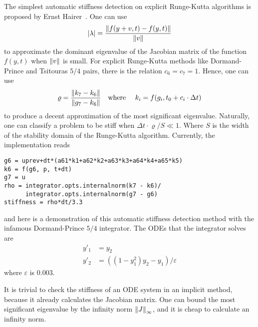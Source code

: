 \documentclass[12pt,a4paper]{article}
\begin{document}
The simplest automatic stiffness detection on explicit Runge-Kutta algorithms
is proposed by Ernst Hairer~\cite{hairer2}. One can use
\begin{equation}
  \abs{\lambda} = \frac{\norm{f(y+v, t)-f(y, t)}}{\norm{v}}
\end{equation}
to approximate the dominant eigenvalue of the Jacobian matrix of the function
$f(y, t)$ when $\norm{v}$ is small. For explicit Runge-Kutta methods like
Dormand-Prince and Tsitouras $5/4$ pairs, there is the relation $c_6 = c_7 =
1$. Hence, one can use
\begin{equation}
  \varrho = \frac{\norm{k_7-k_6}}{\norm{g_7-k_6}}\qqtext{where } k_i = f(g_i,
  t_0 + c_i\cdot \Delta t)
\end{equation}
to produce a decent approximation of the most significant eigenvalue.
Naturally, one can classify a problem to be stiff when $\Delta
t\cdot\varrho/S \ll 1$. Where $S$ is the width of the stability domain of the
Runge-Kutta algorithm. Currently, the implementation reads

\begin{lstlisting}
g6 = uprev+dt*(a61*k1+a62*k2+a63*k3+a64*k4+a65*k5)
k6 = f(g6, p, t+dt)
g7 = u
rho = integrator.opts.internalnorm(k7 - k6)/
      integrator.opts.internalnorm(g7 - g6)
stiffness = rho*dt/3.3
\end{lstlisting}

and here is a demonstration of this automatic stiffness detection method with
the infamous Dormand-Prince $5/4$ integrator. The ODEs that the integrator
solves are
\begin{align}
  y'_1 &= y_2\\
  y'_2 &= ((1-y_1^2)y_2-y_1) / \varepsilon
\end{align}
where $\varepsilon$ is $0.003$.



%
%

It is trivial to check the stiffness of an ODE system in an implicit method,
because it already calculates the Jacobian matrix. One can bound the most
significant eigenvalue by the infinity norm $\norm{J}_{\infty}$, and it is
cheap to calculate an infinity norm.
\end{document}
